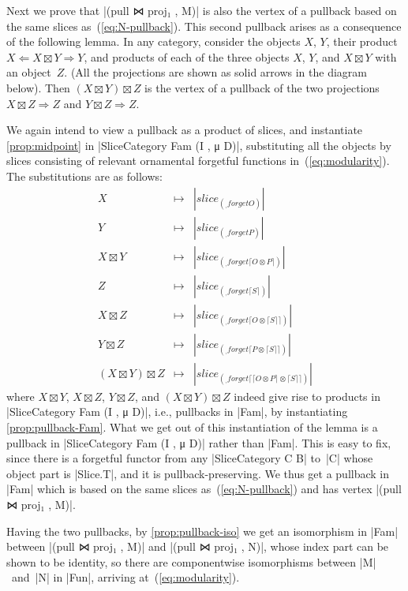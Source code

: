 Next we prove that |(pull ⋈ proj₁ , M)| is also the vertex of a pullback based on the same slices as~(\ref{eq:N-pullback}).
This second pullback arises as a consequence of the following lemma.
In any category, consider the objects $X$, $Y$, their product $X \Leftarrow X \boxtimes Y \Rightarrow Y$, and products of each of the three objects $X$, $Y$, and $X \boxtimes Y$ with an object~$Z$.
(All the projections are shown as solid arrows in the diagram below).
Then $(X \boxtimes Y) \boxtimes Z$ is the vertex of a pullback of the two projections $X \boxtimes Z \Rightarrow Z$ and $Y \boxtimes Z \Rightarrow Z$.
\noindent We again intend to view a pullback as a product of slices, and instantiate \autoref{prop:midpoint} in |SliceCategory Fam (I , μ D)|, substituting all the objects by slices consisting of relevant ornamental forgetful functions in~(\ref{eq:modularity}).
The substitutions are as follows:
\[ \begin{array}{rcl}
X                            & \mapsto & |slice _ (_ , forget O)| \\
Y                            & \mapsto & |slice _ (_ , forget P)| \\
X \boxtimes Y                & \mapsto & |slice _ (_ , forget ⌈ O ⊗ P ⌉)| \\
Z                            & \mapsto & |slice _ (_ , forget ⌈ S ⌉)| \\
X \boxtimes Z                & \mapsto & |slice _ (_ , forget ⌈ O ⊗ ⌈ S ⌉ ⌉)| \\
Y \boxtimes Z                & \mapsto & |slice _ (_ , forget ⌈ P ⊗ ⌈ S ⌉ ⌉)| \\
(X \boxtimes Y) \boxtimes Z  & \mapsto & |slice _ (_ , forget ⌈ ⌈ O ⊗ P ⌉ ⊗ ⌈ S ⌉ ⌉)|
\end{array} \]
where $X \boxtimes Y$, $X \boxtimes Z$, $Y \boxtimes Z$, and $(X \boxtimes Y) \boxtimes Z$ indeed give rise to products in |SliceCategory Fam (I , μ D)|, i.e., pullbacks in |Fam|, by instantiating \autoref{prop:pullback-Fam}.
What we get out of this instantiation of the lemma is a pullback in |SliceCategory Fam (I , μ D)| rather than |Fam|.
This is easy to fix, since there is a forgetful functor from any |SliceCategory C B| to~|C| whose object part is |Slice.T|, and it is pullback-preserving.
We thus get a pullback in |Fam| which is based on the same slices as~(\ref{eq:N-pullback}) and has vertex |(pull ⋈ proj₁ , M)|.

Having the two pullbacks, by \autoref{prop:pullback-iso} we get an isomorphism in |Fam| between |(pull ⋈ proj₁ , M)| and |(pull ⋈ proj₁ , N)|, whose index part can be shown to be identity, so there are componentwise isomorphisms between |M|~and~|N| in |Fun|, arriving at~(\ref{eq:modularity}).
